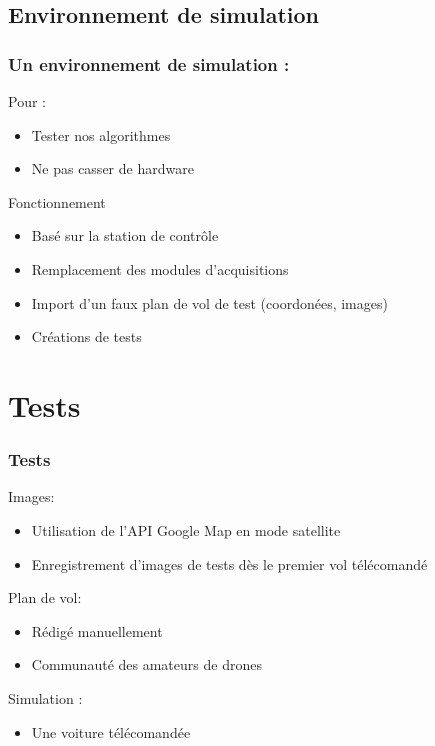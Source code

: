 \documentclass[transparent]{beamer}
\begin{document}
\subsection{Environnement de simulation}

\begin{frame}
	\frametitle{Un environnement de simulation :}
	\begin{block}{Pour :}
			\begin{itemize}
				\item Tester nos algorithmes
				\item Ne pas casser de hardware
			\end{itemize}
	\end{block}
	\begin{block}{Fonctionnement}
			\begin{itemize}
				\item Basé sur la station de contrôle
				\item Remplacement des modules d'acquisitions
				\item Import d'un faux plan de vol de test (coordonées, images)
				\item Créations de tests
			\end{itemize}
	\end{block}
\end{frame}


\section{Tests}

\begin{frame}
\frametitle{Tests}
	\begin{block}{Images:}
			\begin{itemize}
				\item Utilisation de l'API Google Map en mode satellite
				\item Enregistrement d'images de tests dès le premier vol télécomandé
			\end{itemize}
	\end{block}
	\begin{block}{Plan de vol:}
			\begin{itemize}
				\item Rédigé manuellement
				\item Communauté des amateurs de drones
			\end{itemize}
	\end{block}
	\begin{block}{Simulation :}
			\begin{itemize}
				\item Une voiture télécomandée
			\end{itemize}
	\end{block}
\end{frame}
\end{document}
